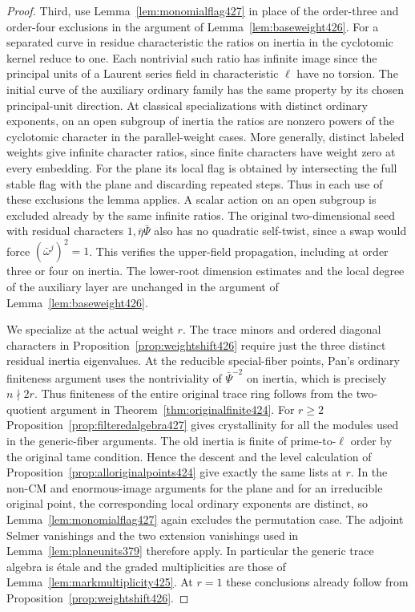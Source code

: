 \documentclass[a4paper,11pt]{article}
\theoremstyle{definition}
\theoremstyle{remark}
\numberwithin{equation}{section}
\begin{document}
\begin{proof}
Third, use Lemma~\ref{lem:monomialflag427} in place of the
order-three and order-four exclusions in the argument of
Lemma~\ref{lem:baseweight426}. For a separated curve in
residue characteristic the ratios on inertia in the cyclotomic
kernel reduce to one. Each nontrivial such ratio has infinite
image since the principal units of a Laurent series field in
characteristic \(\ell\) have no torsion. The initial curve
of the auxiliary ordinary family has the same property by its
chosen principal-unit direction. At classical specializations
with distinct ordinary exponents, on an open subgroup of
inertia the ratios are nonzero powers of the cyclotomic
character in the parallel-weight cases. More generally,
distinct labeled weights give infinite character ratios,
since finite characters have weight zero at every embedding.
For the plane its local flag is obtained by intersecting the
full stable flag with the plane and discarding repeated steps.
Thus in each use of these exclusions the lemma applies. A
scalar action on an open subgroup is excluded already by the
same infinite ratios. The original two-dimensional seed with
residual characters \(1,\bar\eta\bar\Psi\) also has no quadratic
self-twist, since a swap would force \((\bar\omega^j)^2=1\).
This verifies the upper-field propagation, including at order
three or four on inertia. The lower-root dimension estimates
and the local degree of the auxiliary layer are unchanged in
the argument of Lemma~\ref{lem:baseweight426}.

We specialize at the actual weight \(r\). The trace minors
and ordered diagonal characters in Proposition~\ref{prop:weightshift426}
require just the three distinct residual inertia eigenvalues.
At the reducible special-fiber points, Pan's ordinary finiteness
argument uses the nontriviality of \(\bar\Psi^{-2}\) on inertia,
which is precisely \(n\nmid2r\). Thus finiteness of the entire
original trace ring follows from the two-quotient argument
in Theorem~\ref{thm:originalfinite424}. For \(r\ge2\)
Proposition~\ref{prop:filteredalgebra427} gives crystallinity
for all the modules used in the generic-fiber arguments.
The old inertia is finite of prime-to-\(\ell\) order by the
original tame condition. Hence the descent and the level
calculation of Proposition~\ref{prop:alloriginalpoints424} give
exactly the same lists at \(r\). In the non-CM and enormous-image
arguments for the plane and for an irreducible original point,
the corresponding local ordinary exponents are distinct, so
Lemma~\ref{lem:monomialflag427} again excludes the permutation
case. The adjoint Selmer vanishings and the two extension
vanishings used in Lemma~\ref{lem:planeunits379} therefore
apply. In particular the generic trace algebra is \'{e}tale
and the graded multiplicities are those of
Lemma~\ref{lem:markmultiplicity425}. At \(r=1\) these conclusions
already follow from Proposition~\ref{prop:weightshift426}.


\end{proof}
\end{document}
